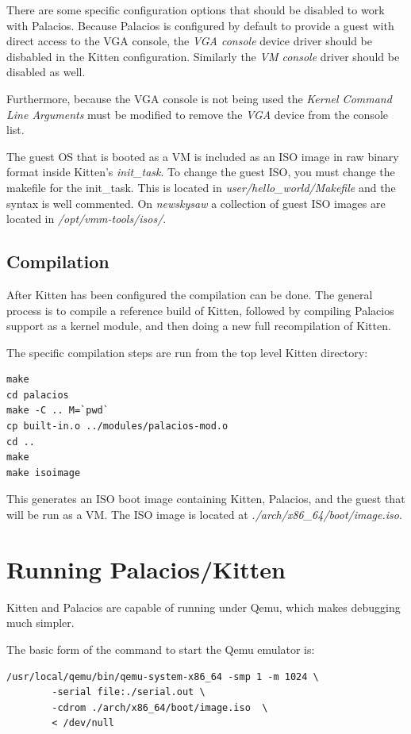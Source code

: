 \documentclass[11pt]{article}
\begin{document}
There are some specific configuration options that should be disabled
to work with Palacios. Because Palacios is configured by default to
provide a guest with direct access to the VGA console, the {\em VGA
console} device driver should be disbabled in the Kitten
configuration. Similarly the {\em VM console} driver should be
disabled as well.

Furthermore, because the VGA console is not being used the {\em Kernel
Command Line Arguments} must be modified to remove the {\em VGA}
device from the console list.

The guest OS that is booted as a VM is included as an ISO image in raw
binary format inside Kitten's {\em init\_task}. To change the guest
ISO, you must change the makefile for the init\_task. This is located
in {\em user/hello\_world/Makefile} and the syntax is well commented.
On {\em newskysaw} a collection of guest ISO images are located in
{\em /opt/vmm-tools/isos/}. 


\subsection{Compilation}
After Kitten has been configured the compilation can be done. The
general process is to compile a reference build of Kitten, followed by
compiling Palacios support as a kernel module, and then doing a new
full recompilation of Kitten.

The specific compilation steps are run from the top level Kitten directory:
\begin{verbatim}
make
cd palacios
make -C .. M=`pwd`
cp built-in.o ../modules/palacios-mod.o
cd ..
make
make isoimage
\end{verbatim}

This generates an ISO boot image containing Kitten, Palacios, and the
guest that will be run as a VM. The ISO image is located at {\em
./arch/x86\_64/boot/image.iso}.


\section{Running Palacios/Kitten}
Kitten and Palacios are capable of running under Qemu, which makes
debugging much simpler.

The basic form of the command to start the Qemu emulator is:
\begin{verbatim}
/usr/local/qemu/bin/qemu-system-x86_64 -smp 1 -m 1024 \
        -serial file:./serial.out \
        -cdrom ./arch/x86_64/boot/image.iso  \
        < /dev/null
\end{verbatim}
\end{document}

